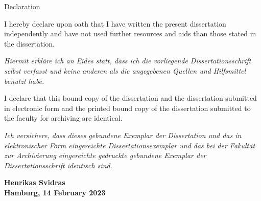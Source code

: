     \begin{abstractpage}{Declaration}
    
        I hereby declare upon oath that I have written the present dissertation independently and have not used further resources and aids than those stated in the dissertation.
        
        \textit{Hiermit erkläre ich an Eides statt, dass ich die vorliegende Dissertationsschrift selbst verfasst und keine anderen als die angegebenen Quellen und Hilfsmittel benutzt habe.}
    
        I declare that this bound copy of the dissertation and the dissertation submitted in electronic form and the printed bound copy of the dissertation submitted to the faculty for archiving are identical.
    
        \textit{Ich versichere, dass dieses gebundene Exemplar der Dissertation und das in elektronischer Form eingereichte Dissertationsexemplar und das bei der Fakultät zur Archivierung eingereichte gedruckte gebundene Exemplar der Dissertationsschrift identisch sind.}
    
        \par\bigskip
        \par\bigskip
        
        \begin{flushright}
        \par\bigskip
        \textbf{Henrikas Svidras}\\
        \textbf{Hamburg, 14 February 2023}
        \end{flushright}
        \end{abstractpage}
